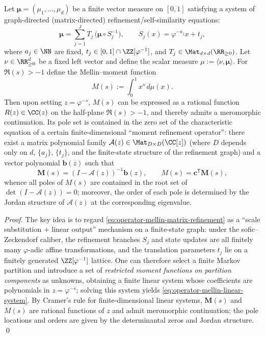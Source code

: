 \begin{theorem}\label{thm:conclusion62-mellin-rational}
Let \(\boldsymbol{\mu}=(\mu_1,\dots,\mu_d)\) be a finite vector measure on \([0,1]\) satisfying a system of graph-directed (matrix-directed) refinement/self-similarity equations:
\begin{equation}\label{eq:operator-mellin-matrix-refinement}
\boldsymbol{\mu}
=\sum_{j=1}^{J}T_j\,\bigl(\boldsymbol{\mu}\circ S_j^{-1}\bigr),
\qquad
S_j(x)=\varphi^{-a_j}x+t_j,
\end{equation}
where \(a_j\in\NN\) are fixed, \(t_j\in[0,1]\cap\ZZ[\varphi^{-1}]\), and \(T_j\in\Mat_{d\times d}(\RR_{\ge 0})\).
Let \(\nu\in\RR_{\ge 0}^d\) be a fixed left vector and define the scalar measure \(\mu:=\langle \nu,\boldsymbol{\mu}\rangle\).
For \(\Re(s)>-1\) define the Mellin--moment function
\[
M(s):=\int_{0}^{1}x^{s}\,d\mu(x).
\]
Then upon setting \(z=\varphi^{-s}\), \(M(s)\) can be expressed as a rational function \(R(z)\in\CC(z)\) on the half-plane \(\Re(s)>-1\), and thereby admits a meromorphic continuation.
Its pole set is contained in the zero set of the characteristic equation of a certain finite-dimensional ``moment refinement operator'':
there exist a matrix polynomial family \(\mathcal{A}(z)\in\Mat_{D\times D}(\CC[z])\) (where \(D\) depends only on \(d\), \(\{a_j\}\), \(\{t_j\}\), and the finite-state structure of the refinement graph) and a vector polynomial \(\mathbf{b}(z)\) such that
\begin{equation}\label{eq:operator-mellin-linear-system}
\mathbf{M}(s)=(I-\mathcal{A}(z))^{-1}\mathbf{b}(z),
\qquad
M(s)=\mathbf{c}^{\mathsf T}\mathbf{M}(s),
\end{equation}
whence all poles of \(M(s)\) are contained in the root set of \(\det(I-\mathcal{A}(z))=0\); moreover, the order of each pole is determined by the Jordan structure of \(\mathcal{A}(z)\) at the corresponding eigenvalue.
\end{theorem}

\begin{proof}
The key idea is to regard \eqref{eq:operator-mellin-matrix-refinement} as a ``scale substitution + linear output'' mechanism on a finite-state graph: under the sofic--Zeckendorf caliber, the refinement branches \(S_j\) and state updates are all finitely many \(\varphi\)-adic affine transformations, and the translation parameters \(t_j\) lie on a finitely generated \(\ZZ[\varphi^{-1}]\) lattice.
One can therefore select a finite Markov partition and introduce a set of \emph{restricted moment functions on partition components} as unknowns, obtaining a finite linear system whose coefficients are polynomials in \(z=\varphi^{-s}\); solving this system yields \eqref{eq:operator-mellin-linear-system}.
By Cramer's rule for finite-dimensional linear systems, \(\mathbf{M}(s)\) and \(M(s)\) are rational functions of \(z\) and admit meromorphic continuation; the pole locations and orders are given by the determinantal zeros and Jordan structure. \qed
\end{proof}


